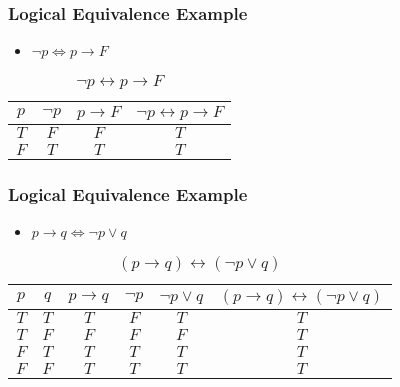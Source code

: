 \documentclass[dvipsnames]{beamer}
\begin{document}
\begin{frame}
  \frametitle{Logical Equivalence Example}

  \begin{example}
    \begin{itemize}
      \item $\neg p \Leftrightarrow p \rightarrow F$
    \end{itemize}

    \begin{table}
      \caption{$\neg p \leftrightarrow p \rightarrow F$}
      \begin{tabular}{|c|c|c||c|}\hline
        $p$ & $\neg p$ & $p \rightarrow F$
            & $\neg p \leftrightarrow p \rightarrow F$\\\hline\hline
        $T$ & $F$ & $F$ & $T$\\\hline
        $F$ & $T$ & $T$ & $T$\\\hline
      \end{tabular}
    \end{table}
  \end{example}
\end{frame}

\begin{frame}
  \frametitle{Logical Equivalence Example}

  \begin{example}
    \begin{itemize}
      \item $p \rightarrow q \Leftrightarrow \neg p \vee q$
    \end{itemize}

    \begin{table}
      \caption{$(p \rightarrow q) \leftrightarrow (\neg p \vee q)$}
      \begin{tabular}{|c|c|c|c|c||c|}\hline
        $p$ & $q$ & $p \rightarrow q$ & $\neg p$ & $\neg p \vee q$
            & $(p \rightarrow q) \leftrightarrow (\neg p \vee q)$\\\hline\hline
        $T$ & $T$ & $T$ & $F$ & $T$ & $T$\\\hline
        $T$ & $F$ & $F$ & $F$ & $F$ & $T$\\\hline
        $F$ & $T$ & $T$ & $T$ & $T$ & $T$\\\hline
        $F$ & $F$ & $T$ & $T$ & $T$ & $T$\\\hline
      \end{tabular}
    \end{table}
  \end{example}
\end{frame}
\end{document}
